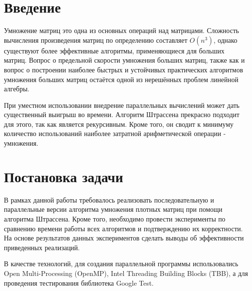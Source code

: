 \documentclass{report}
\begin{document}
\setcounter{page}{2}

\tableofcontents
\newpage

\section*{Введение}
\par  Умножение матриц это одна из основных операций над матрицами. Сложность вычисления произведения матриц по определению составляет  $O(n^3)$, однако существуют более эффективные алгоритмы, применяющиеся для больших матриц. Вопрос о предельной скорости умножения больших матриц, также как и вопрос о построении наиболее быстрых и устойчивых практических алгоритмов умножения больших матриц остаётся одной из нерешённых проблем линейной алгебры.
\par  При уместном использовании внедрение параллельных вычислений может дать существенный выигрыш во времени. Алгоритм Штрассена прекрасно подходит для этого, так как является рекурсивным. Кроме того, он сводит к минимуму количество использований наиболее затратной арифметической операции - умножения.
\newpage

\section*{Постановка задачи}
\par В рамках данной работы требовалось реализовать последовательную и параллельные версии алгоритма умножения плотных матриц при помощи алгоритма Штрассена. Кроме того, необходимо провести эксперименты по сравнению времени работы всех алгоритмов и подтверждению их корректности. На основе результатов данных экспериментов сделать выводы об эффективности приведенных реализаций.
\par В качестве технологий, для создания параллельной программы использовались Open Multi-Processing (OpenMP), Intel Threading Building Blocks (TBB), а для проведения тестирования библиотека Google Test.
\newpage

\end{document}

